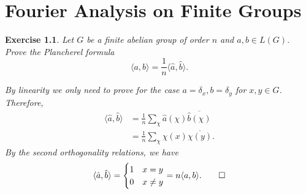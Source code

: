 \documentclass[11pt]{report}
\theoremstyle{mythm}
\let\oldendproof\endproof
\renewenvironment{proof}[1][\proofname]{%
  \oldproof[\normalfont \bfseries #1]%
}{\oldendproof}
\newtheorem{exercise}{Exercise}[chapter]
\renewcommand*{\proofname}{Proof}
\theoremstyle{myans}
\newcommand{\ang}[1]{\langle #1 \rangle}
\begin{document}
\setcounter{chapter}{4}
\chapter{Fourier Analysis on Finite Groups}

\setcounter{exercise}{5}
\begin{exercise}
  Let $G$ be a finite abelian group of order $n$ and $a,b\in L(G)$. Prove the
  Plancherel formula
  \[ \ang{a, b} = \frac 1 n \ang{\hat a, \hat b}. \]
  \begin{proof}
    By linearity we only need to prove for the case $a = \delta_x, b = \delta_y$
    for $x, y\in G$. Therefore,
    \begin{align*}
      \ang{\hat a, \hat b} &= \frac 1n \sum_{\chi} \hat a (\chi) \overline{\hat b(\chi)}\\
      &= \frac 1n \sum_{\chi} \chi(x) \overline{\chi(y)}.
    \end{align*}
    By the second orthogonality relations, we have
    \[ \ang{\hat a, \hat b} = \begin{cases}
      1 & x = y\\
      0 & x \neq y
    \end{cases} = n \ang{a, b}. \qedhere \]
  \end{proof}
\end{exercise}
\end{document}
